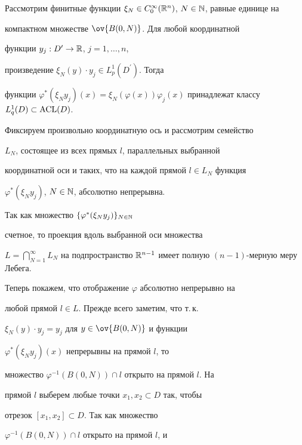 \begin{pf}


Рассмотрим финитные функции $\xi_N\in


C^{\infty}_0({\Bbb R}^n)$, $N\in {\Bbb N}$, равные единице на


компактном множестве $\ov{B(0,N)}$. Для любой координатной


функции $y_j : D^{\prime}\to {\Bbb R}$, $j=1,\dotsc,n$,


произведение $\xi_N(y)\cdot y_j \in L^1_p(D^{\prime})$. Тогда


функции $\varphi^{\ast}(\xi_N y_j)(x) =


\xi_N(\varphi(x))\varphi_j(x)$ принадлежат классу $L^1_q(D)\subset


\ACL(D)$.





Фиксируем произвольно координатную ось и рассмотрим семейство


$L_N$, состоящее из всех прямых $l$, параллельных выбранной


координатной оси и таких, что на каждой прямой $l\in L_N$ функция


$\varphi^{\ast}(\xi_N y_j)$, $N\in {\Bbb N}$, абсолютно непрерывна.


Так как множество $\{\varphi^{\ast}(\xi_N y_j)\}_{N\in {\Bbb N}}$


счетное, то проекция вдоль выбранной оси множества


$L=\bigcap\limits_{N=1}^\infty L_N$ на подпространство ${\Bbb


R}^{n-1}$ имеет полную $(n-1)$-мерную меру Лебега.





Теперь покажем, что отображение $\varphi$ абсолютно непрерывно на


любой прямой $l\in L$. Прежде всего заметим, что т.\,к.


$\xi_N(y)\cdot y_j = y_j$ для $y\in \ov{B(0,N)}$ и функции


$\varphi^{\ast}(\xi_N y_j)(x)$ непрерывны на прямой $l$, то


множество $\varphi^{-1}(B(0,N))\cap l$ открыто на прямой $l$. На


прямой $l$ выберем любые точки $x_1,x_2\subset D$ так, чтобы


отрезок $[x_1,x_2]\subset D$. Так как множество


$\varphi^{-1}(B(0,N))\cap l$ открыто на прямой $l$, и



\end{pf}
